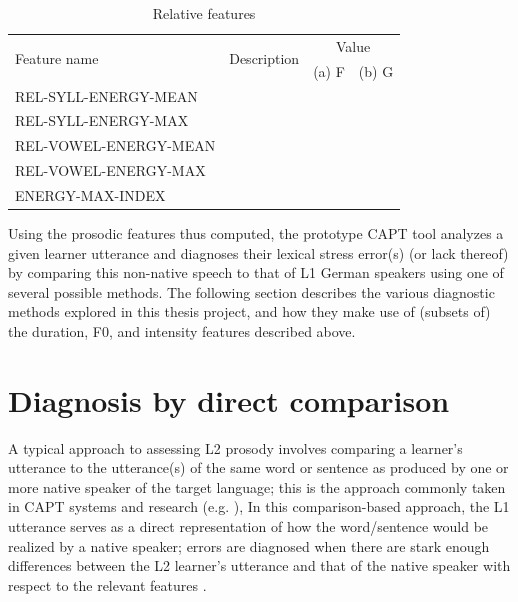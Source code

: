 \begin{table}[h!]
	\begin{subtable}[h]{\textwidth}
	\caption{Relative features}
	\begin{tabularx}{\textwidth}{p{}Xrr}
	\toprule
	\multirow{2}{*}{Feature name} 
					& \multirow{2}{*}{Description}
										& \multicolumn{2}{c}{Value} \\	
				  	&							&  (a) F		& (b) G			\\
	\midrule
	
REL-SYLL-ENERGY-MEAN & \color{red}{TD} &  \color{red}{TD}	& \color{red}{TD}\\
REL-SYLL-ENERGY-MAX & \color{red}{TD} &  \color{red}{TD}	& \color{red}{TD}\\
REL-VOWEL-ENERGY-MEAN & \color{red}{TD} &  \color{red}{TD}	& \color{red}{TD}\\
REL-VOWEL-ENERGY-MAX & \color{red}{TD} &  \color{red}{TD}	& \color{red}{TD}\\
ENERGY-MAX-INDEX & \color{red}{TD} &  \color{red}{TD}	& \color{red}{TD}\\
	
	\bottomrule
	\end{tabularx}
	\end{subtable}
\label{tab:intfeatures}
\end{table}
	
	
\vspace{2em}
	
Using the prosodic features thus computed, the prototype CAPT tool analyzes a given learner utterance and diagnoses their lexical stress error(s) (or lack thereof) by comparing this non-native speech to that of L1 German speakers using one of several possible methods. The following section describes the various diagnostic methods explored in this thesis project, and how they make use of (subsets of) the duration, F0, and intensity features described above. 
	
	
\section{Diagnosis by direct comparison}
\label{sec:diag:compare}


A typical approach to assessing L2 prosody involves comparing a learner's utterance to the utterance(s) of the same word or sentence as produced by one or more native speaker of the target language; this is the approach commonly taken in CAPT systems and research
(e.g. ),  %
In this comparison-based approach, the L1 utterance serves as a direct representation of how the word/sentence would be realized by a native speaker; errors are diagnosed when there are stark enough differences between the L2 learner's utterance and that of the native speaker with respect to the relevant features .

